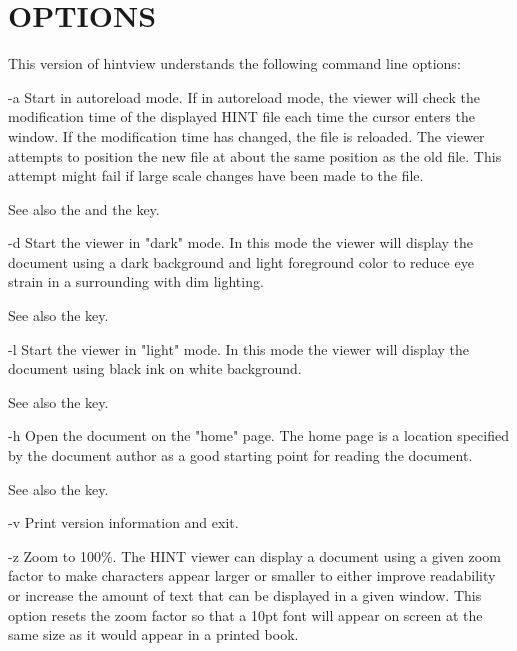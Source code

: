 \section{OPTIONS}
       This  version  of  hintview  understands the following command line options:
       
\itemize
\item{-a}     Start in autoreload mode. If in autoreload mode, the viewer will
              check the modification time of the displayed HINT file each time
              the cursor enters the window.   If  the  modification  time  has
              changed,  the file is reloaded.  The viewer attempts to position
              the new file at about the same position as the  old  file.  This
              attempt  might fail if large scale changes have been made to the
              file.

              See also the  and the  key.

\item{-d}     Start the viewer in "dark" mode. In this mode the  viewer  will
              display  the  document  using  a dark background and light foreground
              color to reduce eye strain  in  a  surrounding  with  dim
              lighting.

              See also the  key.

\item{-l}     Start the viewer in "light" mode. In this mode the  viewer  will
              display  the  document  using  black ink on white background.

              See also the  key.

\item{-h}     Open the document on the "home" page. The home page is  a  location
              specified  by the document author as a good starting point
              for reading the document.

              See also the  key.

\item{-v}     Print version information and exit.

\item{-z}     Zoom  to  100\%.  The  HINT viewer can display a document using a
              given zoom factor to make characters appear larger or smaller to
              either  improve  readability or increase the amount of text that
              can be displayed in a given window. This option resets the  zoom
              factor  so  that  a  10pt font will appear on screen at the same
              size as it would appear in a printed book.

